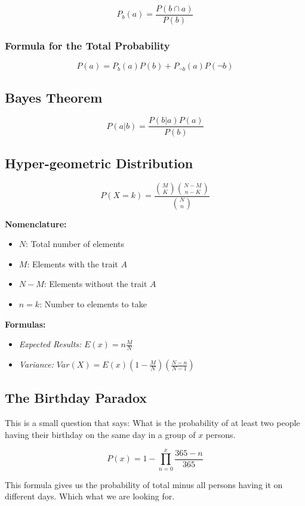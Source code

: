\[
    P_b (a) = \frac{P(b \cap a)}{P(b)}
\]

\subsubsection{Formula for the Total Probability}

\[
    P(a) = P_b (a) P(b) + P_{\neg b}(a) P(\neg b)
\]

\subsection{Bayes Theorem}

\[
    P(a | b) = \frac{P(b | a) P(a)}{P(b)}
\]

\subsection{Hyper-geometric Distribution}

\[
    P(X = k) = \frac{\binom{M}{K} \binom{N - M}{n - K}}{\binom{N}{n}}
\]

\textbf{Nomenclature:}

\begin{itemize}
    \item \(N\): Total number of elements
    \item \(M\): Elements with the trait \(A\)
    \item \(N - M\): Elements without the trait \(A\)
    \item \(n = k\): Number to elements to take
\end{itemize}

\textbf{Formulas:}

\begin{itemize}
    \item \emph{Expected Results: } \(E(x) = n \frac{M}{N}\)
    \item \emph{Variance: } \(Var(X) = E(x)\left(1 - \frac{M}{N}\right) \left(\frac{N - n}{N - 1}\right)\)
\end{itemize}

\subsection{The Birthday Paradox}

This is a small question that says: What is the probability of at least two people having 
their birthday on the same day in a group of \(x\) persons.

\[
    P(x) = 1 - \prod_{n = 0}^{x} \frac{365 - n}{365}
\]

This formula gives us the probability of total minus all persons having it on different days. Which
what we are looking for.